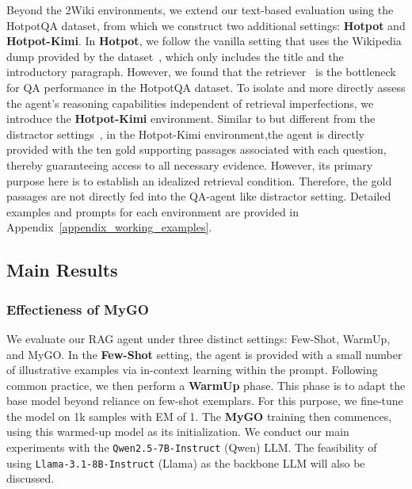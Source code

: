 Beyond the 2Wiki environments, we extend our text-based evaluation using the HotpotQA dataset, from which we construct two additional settings: \textbf{Hotpot} and \textbf{Hotpot-Kimi}.
In \textbf{Hotpot}, we follow the vanilla setting that uses the Wikipedia dump provided by the dataset~\cite{yang2018hotpotqa}, which only includes the title and the introductory paragraph.
However, we found that the  retriever~\cite{karpukhin2020dense} is the bottleneck for QA performance in the HotpotQA dataset.
To isolate and more directly assess the agent's reasoning capabilities independent of retrieval imperfections, we introduce the \textbf{Hotpot-Kimi} environment.
Similar to but different from the distractor settings~\citep{yang2018hotpotqa, ho2020constructing}, in the {Hotpot-Kimi} environment,the agent is directly provided with the ten gold supporting passages associated with each question, thereby guaranteeing access to all necessary evidence.
However, its primary purpose here is to establish an idealized retrieval condition.
Therefore, the gold passages are not directly fed into the QA-agent like distractor setting. %
Detailed examples and prompts for each environment are provided in Appendix~\ref{appendix_working_examples}.

\subsection{Main Results}
\subsubsection{\textbf{Effectieness of MyGO}}
We evaluate our RAG agent under three distinct settings: Few-Shot, WarmUp, and MyGO. In the \textbf{Few-Shot} setting, the agent is provided with a small number of illustrative examples via in-context learning within the prompt.
Following common practice, we then perform a \textbf{WarmUp} phase.
This phase is to adapt the base model beyond reliance on few-shot exemplars.
For this purpose, we fine-tune the model on 1k samples with EM of 1.
The \textbf{MyGO} training then commences, using this warmed-up model as its initialization.
We conduct our main experiments with the \texttt{Qwen2.5-7B-Instruct} (Qwen) LLM. The feasibility of using \texttt{Llama-3.1-8B-Instruct} (Llama) as the backbone LLM will also be discussed.

